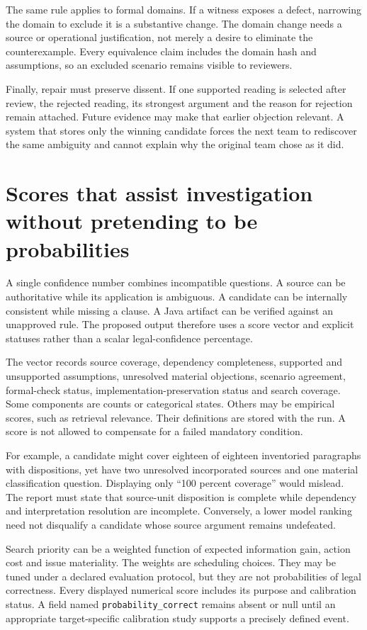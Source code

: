 \documentclass[12pt,a4paper,oneside,openany]{book}
\begin{document}
The same rule applies to formal domains. If a witness exposes a defect, narrowing
the domain to exclude it is a substantive change. The domain change needs a
source or operational justification, not merely a desire to eliminate the
counterexample. Every equivalence claim includes the domain hash and assumptions,
so an excluded scenario remains visible to reviewers.

Finally, repair must preserve dissent. If one supported reading is selected after
review, the rejected reading, its strongest argument and the reason for rejection
remain attached. Future evidence may make that earlier objection relevant. A
system that stores only the winning candidate forces the next team to rediscover
the same ambiguity and cannot explain why the original team chose as it did.

\section{Scores that assist investigation without pretending to be probabilities}

A single confidence number combines incompatible questions. A source can be
authoritative while its application is ambiguous. A candidate can be internally
consistent while missing a clause. A Java artifact can be verified against an
unapproved rule. The proposed output therefore uses a score vector and explicit
statuses rather than a scalar legal-confidence percentage.

The vector records source coverage, dependency completeness, supported and
unsupported assumptions, unresolved material objections, scenario agreement,
formal-check status, implementation-preservation status and search coverage.
Some components are counts or categorical states. Others may be empirical
scores, such as retrieval relevance. Their definitions are stored with the run.
A score is not allowed to compensate for a failed mandatory condition.

For example, a candidate might cover eighteen of eighteen inventoried paragraphs
with dispositions, yet have two unresolved incorporated sources and one material
classification question. Displaying only ``100 percent coverage'' would mislead.
The report must state that source-unit disposition is complete while dependency
and interpretation resolution are incomplete. Conversely, a lower model ranking
need not disqualify a candidate whose source argument remains undefeated.

Search priority can be a weighted function of expected information gain, action
cost and issue materiality. The weights are scheduling choices. They may be tuned
under a declared evaluation protocol, but they are not probabilities of legal
correctness. Every displayed numerical score includes its purpose and calibration
status. A field named \texttt{probability\_correct} remains absent or null until an
appropriate target-specific calibration study supports a precisely defined event.
\end{document}
